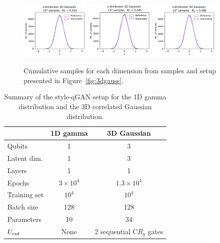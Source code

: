 \documentclass[twocolumn,preprintnumbers,superscriptaddress]{revtex4-2}
\begin{document}
\begin{figure}

  \includegraphics[width=0.3\textwidth]{plots/3Dgaussian_posdef/1-distribution_3dgaussian_100k.pdf}%
  \includegraphics[width=0.3\textwidth]{plots/3Dgaussian_posdef/2-distribution_3dgaussian_100k.pdf}%
  \includegraphics[width=0.3\textwidth]{plots/3Dgaussian_posdef/3-distribution_3dgaussian_100k.pdf}

  \caption{\label{fig:3dgauss_2}Cumulative samples for each dimension from samples and setup presented in Figure~\ref{fig:3dgauss}.}
\end{figure}

\begin{table}
  \begin{tabular}{l|c|c}
     & {\bf 1D gamma} & {\bf 3D Gaussian} \tabularnewline
    \hline
    Qubits & 1 & 3 \tabularnewline
    Latent dim. & 1 & 3 \tabularnewline
    Layers & 1 & 1 \tabularnewline
    Epochs & $3\times10^4$ & $1.3\times10^4$ \tabularnewline
    Training set & $10^4$ & $10^4$ \tabularnewline
    Batch size & 128 & 128 \tabularnewline
    Parameters & 10 & 34 \tabularnewline
    $U_{\rm ent}$ & None & 2 sequential C$R_y$ gates \tabularnewline
    \hline
  \end{tabular}

  \caption{\label{table:summary} Summary of the style-qGAN setup for the 1D
  gamma distribution and the 3D correlated Gaussian distribution.}
\end{table}
\end{document}
